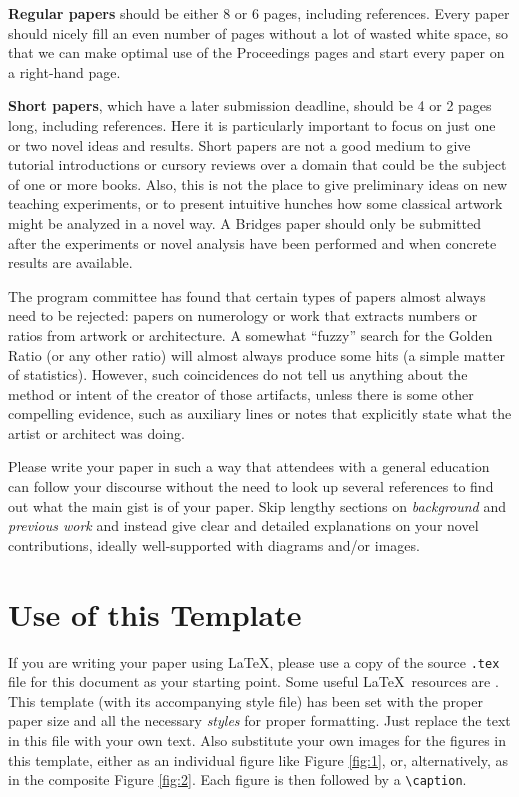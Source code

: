 \documentclass[letterpaper,11pt]{article}
\begin{document}
\textbf{Regular papers} should be either 8 or 6 pages, including references. Every paper should nicely
fill an even number of pages without a lot of wasted white space, so
that we can make optimal use of the Proceedings pages and start every
paper on a right-hand page.

\textbf{Short papers}, which have a later submission deadline, should be
4 or 2 pages long, including references. Here it is particularly important to focus 
on just one or two novel ideas and results. Short papers are not a good medium
to give tutorial introductions or cursory reviews over a domain that could be the 
subject of one or more books. Also, this is not the place to give preliminary ideas 
on new teaching experiments, or to present intuitive hunches how some classical 
artwork might be analyzed in a novel way. A Bridges paper should only be submitted 
after the experiments or novel analysis have been performed and when concrete results are available.

The program committee has found that certain types of papers almost always 
need to be rejected: papers on numerology or work that extracts numbers or 
ratios from artwork or architecture. A somewhat ``fuzzy'' search for the Golden 
Ratio (or any other ratio) will almost always produce some hits (a simple matter of 
statistics). However, such coincidences do not tell us anything about the method 
or intent of the creator of those artifacts, unless there is some other
compelling evidence, such as auxiliary lines or notes that explicitly
state what the artist or architect was doing.

Please write your paper in such a way that attendees with a general
education can follow your discourse without the need to look up several
references to find out what the main gist is of your paper. Skip lengthy
sections on \emph{background} and \emph{previous work} and instead give
clear and detailed explanations on your novel contributions, ideally
well-supported with diagrams and/or images.


\section*{Use of this Template}

\noindent If you are writing your paper using \LaTeX, please use a
copy of the source \texttt{.tex} file for this document as your starting point. Some 
useful \LaTeX\ resources are \cite{Chang, Gratzer}. This template (with its accompanying 
style file) has been set with the proper paper size and all the necessary \emph{styles} for
proper formatting. Just replace the text in this file with your own text. Also substitute 
your own images for the figures in this template, either as an individual figure like 
Figure \ref{fig:1}, or, alternatively, as in the composite Figure \ref{fig:2}. Each figure is then 
followed by a \verb|\caption|.
\end{document}
